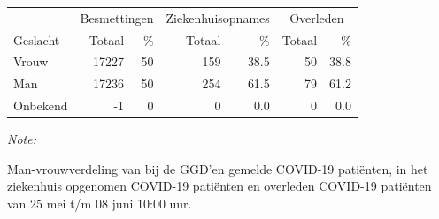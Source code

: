 \documentclass[
  english,
  man,floatsintext]{apa6}
\begin{document}
\begin{table}
\centering\begingroup\fontsize{11}{13}\selectfont

\begin{threeparttable}
\begin{tabular}{lrrrrrr}
\toprule
\multicolumn{1}{c}{ } & \multicolumn{2}{c}{Besmettingen} & \multicolumn{2}{c}{Ziekenhuisopnames} & \multicolumn{2}{c}{Overleden} \\
\cmidrule(l{3pt}r{3pt}){2-3} \cmidrule(l{3pt}r{3pt}){4-5} \cmidrule(l{3pt}r{3pt}){6-7}
Geslacht & Totaal & \% & Totaal & \% & Totaal & \%\\
\midrule
Vrouw & 17227 & 50 & 159 & 38.5 & 50 & 38.8\\
Man & 17236 & 50 & 254 & 61.5 & 79 & 61.2\\
Onbekend & -1 & 0 & 0 & 0.0 & 0 & 0.0\\
\bottomrule
\end{tabular}
\begin{tablenotes}
\item \textit{Note: } 
\item Man-vrouwverdeling van bij de GGD’en gemelde COVID-19 patiënten, in het ziekenhuis opgenomen COVID-19 patiënten en overleden COVID-19 patiënten van 25 mei t/m 08 juni 10:00 uur.
\end{tablenotes}
\end{threeparttable}
\endgroup{}
\end{table}
\newpage
\end{document}
